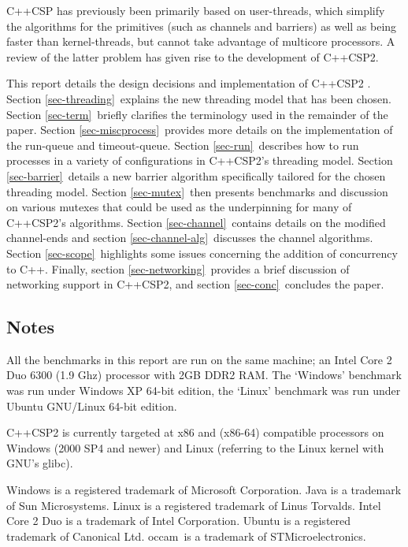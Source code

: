 \documentclass[12pt]{IOS-Book-Article-CPA-2007}
\newcommand{\occam}{occam}
\begin{document}

C++CSP has previously been primarily based on user-threads, which simplify the algorithms for the primitives
(such as channels and barriers) as well as being faster than kernel-threads, but cannot take advantage of multicore processors.  A 
review of the latter problem has given rise to the development of C++CSP2.

This report details the design decisions and implementation of C++CSP2 \cite{web-c++csp2}.  Section \ref{sec-threading}~explains the new threading
model that has been chosen.  Section \ref{sec-term}~briefly clarifies the terminology used in the remainder of the paper. 
Section \ref{sec-miscprocess}~provides more details on the implementation of the run-queue and timeout-queue.  Section \ref{sec-run}~describes how to 
run processes in a variety of configurations in C++CSP2's threading model.
Section \ref{sec-barrier}~details a new barrier algorithm specifically tailored for the chosen threading model.  Section \ref{sec-mutex}~then presents 
benchmarks and discussion on various mutexes that could be used as the underpinning for many of C++CSP2's algorithms.
Section \ref{sec-channel}~contains details on the modified channel-ends and section \ref{sec-channel-alg}~discusses the channel algorithms.  Section 
\ref{sec-scope}~highlights some issues concerning the addition of concurrency to C++.  Finally, section \ref{sec-networking}~provides a brief discussion of networking support in 
C++CSP2, and section \ref{sec-conc}~concludes the paper.

\subsection*{Notes}

All the benchmarks in this report are run on the same machine; an Intel Core 2 Duo 6300 (1.9 Ghz) processor with 2GB DDR2 RAM.  The `Windows' benchmark was run
under Windows XP 64-bit edition, the `Linux' benchmark was run under Ubuntu GNU/Linux 64-bit edition.

C++CSP2 is currently targeted at x86 and (x86-64) compatible processors on Windows (2000 SP4 and newer) and Linux (referring to the Linux kernel with 
GNU's glibc).

Windows is a registered trademark of Microsoft Corporation.  Java is a trademark of Sun Microsystems.  Linux is a registered trademark of Linus Torvalds.
Intel Core 2 Duo is a trademark of Intel Corporation.  Ubuntu is a registered trademark of Canonical Ltd.  \occam~is a trademark of STMicroelectronics.
\end{document}
